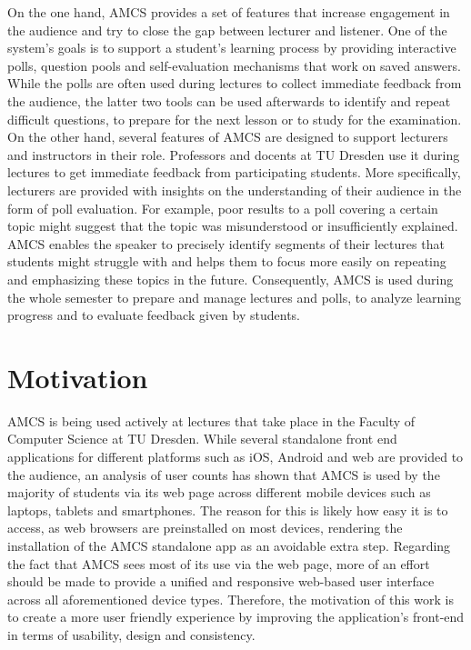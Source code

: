On the one hand, AMCS provides a set of features that increase engagement in the audience and try to close the gap between lecturer and listener. One of the system's goals is to support a student's learning process by providing interactive polls, question pools and self-evaluation mechanisms that work on saved answers. While the polls are often used during lectures to collect immediate feedback from the audience, the latter two tools can be used afterwards to identify and repeat difficult questions, to prepare for the next lesson or to study for the examination.
\newline
\newline
On the other hand, several features of AMCS are designed to support lecturers and instructors in their role. Professors and docents at TU Dresden use it during lectures to get immediate feedback from participating students. More specifically, lecturers are provided with insights on the understanding of their audience in the form of poll evaluation. For example, poor results to a poll covering a certain topic might suggest that the topic was misunderstood or insufficiently explained. AMCS enables the speaker to precisely identify segments of their lectures that students might struggle with and helps them to focus more easily on repeating and emphasizing these topics in the future. 
Consequently, AMCS is used during the whole semester to prepare and manage lectures and polls, to analyze learning progress and to evaluate feedback given by students.
\newline
\newline
\section{Motivation}
AMCS is being used actively at lectures that take place in the Faculty of Computer Science at TU Dresden.
While several standalone front end applications for different platforms such as iOS, Android and web are provided to the audience, an analysis of user counts has shown that AMCS is used by the majority of students via its web page across different mobile devices such as laptops, tablets and smartphones.
The reason for this is likely how easy it is to access, as web browsers are preinstalled on most devices, rendering the installation of the AMCS standalone app as an avoidable extra step.
\newline
\newline 
Regarding the fact that AMCS sees most of its use via the web page, more of an effort should be made to provide a unified and responsive web-based user interface across all aforementioned device types.
\newline
\newline 
Therefore, the motivation of this work is to create a more user friendly experience by improving the application's front-end in terms of usability, design and consistency.
